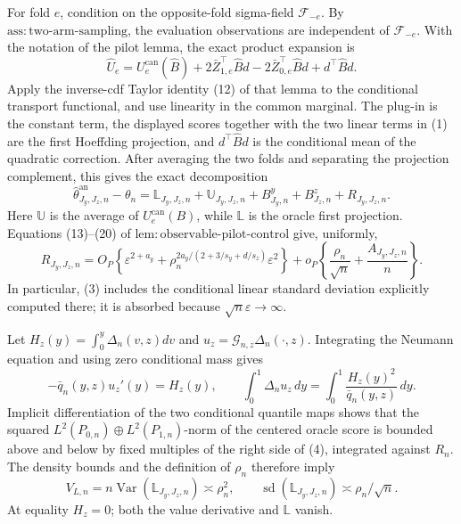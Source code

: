 For fold \(e\), condition on the opposite-fold sigma-field \(\mathscr F_{-e}\). By \(\mathrm{ass{:}two\text{-}arm\text{-}sampling}\), the evaluation observations are independent of \(\mathscr F_{-e}\). With the notation of the pilot lemma, the exact product expansion is
\[
\widehat U_e=U_e^{\mathrm{can}}(\widehat B)
+2\bar Z_{1,e}^\top\widehat Bd-2\bar Z_{0,e}^\top\widehat Bd+d^\top\widehat Bd. \tag{1}
\]
Apply the inverse-cdf Taylor identity (12) of that lemma to the conditional transport functional, and use linearity in the common marginal. The plug-in is the constant term, the displayed scores together with the two linear terms in (1) are the first Hoeffding projection, and \(d^\top\widehat Bd\) is the conditional mean of the quadratic correction. After averaging the two folds and separating the projection complement, this gives the exact decomposition
\[
\widehat\theta^{\mathrm{an}}_{J_y,J_z,n}-\theta_n
=\mathbb L_{J_y,J_z,n}+\mathbb U_{J_y,J_z,n}
+B^y_{J_y,n}+B^z_{J_z,n}+R_{J_y,J_z,n}.                              \tag{2}
\]
Here \(\mathbb U\) is the average of \(U_e^{\mathrm{can}}(B)\), while \(\mathbb L\) is the oracle first projection. Equations (13)--(20) of \(\mathrm{lem{:}observable\text{-}pilot\text{-}control}\) give, uniformly,
\[
R_{J_y,J_z,n}
=O_P\!\left\{\varepsilon^{2+a_y}+\rho_n^{2a_y/(2+3/s_y+d/s_z)}\varepsilon^2\right\}
+o_P\!\left\{\frac{\rho_n}{\sqrt n}+\frac{A_{J_y,J_z,n}}n\right\}. \tag{3}
\]
In particular, (3) includes the conditional linear standard deviation explicitly computed there; it is absorbed because \(\sqrt n\varepsilon\to\infty\).

Let \(H_z(y)=\int_0^y\Delta_n(v,z)dv\) and \(u_z=\mathcal G_{n,z}\Delta_n(\cdot,z)\). Integrating the Neumann equation and using zero conditional mass gives
\[
-\bar q_n(y,z)u_z'(y)=H_z(y),
\qquad
\int_0^1\Delta_nu_z\,dy=\int_0^1\frac{H_z(y)^2}{\bar q_n(y,z)}\,dy.       \tag{4}
\]
Implicit differentiation of the two conditional quantile maps shows that the squared \(L^2(P_{0,n})\oplus L^2(P_{1,n})\)-norm of the centered oracle score is bounded above and below by fixed multiples of the right side of (4), integrated against \(R_n\). The density bounds and the definition of \(\rho_n\) therefore imply
\[
V_{L,n}=n\operatorname{Var}(\mathbb L_{J_y,J_z,n})\asymp\rho_n^2,
\qquad \operatorname{sd}(\mathbb L_{J_y,J_z,n})\asymp\rho_n/\sqrt n. \tag{5}
\]
At equality \(H_z=0\); both the value derivative and \(\mathbb L\) vanish.

